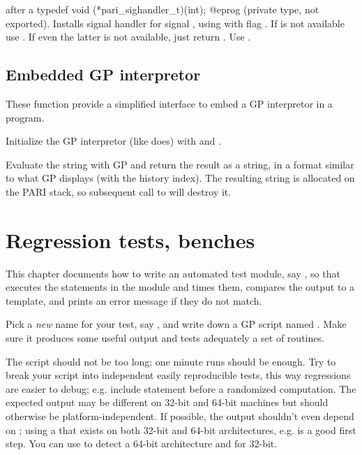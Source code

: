  after a
\bprog
  typedef void (*pari_sighandler_t)(int);
@eprog\noindent
(private type, not exported). Installs signal handler  for
signal , using  with flag . If
 is not available use . If even the latter is not
available, just return . Use .

\section{Embedded GP interpretor}
These function provide a simplified interface to embed a GP
interpretor in a program.

Initialize the GP interpretor (like  does) with
  and .

Evaluate the string  with GP and return the result as a string,
in a format similar to what GP displays (with the history index).
The resulting string is allocated on the PARI stack, so subsequent call
to  will destroy it.

\chapter{Regression tests, benches}

This chapter documents how to write an automated test module, say ,
so that  executes the statements in the  module
and times them, compares the output to a template, and prints an error
message if they do not match.

\item Pick a \emph{new} name for your test, say , and write down a
GP script named . Make sure it produces some useful output and tests
adequately a set of routines.

\item The script should not be too long: one minute runs should be enough.
Try to break your script into independent easily reproducible tests, this way
regressions are easier to debug; e.g. include  statement before
a randomized computation. The expected output may be different on 32-bit and
64-bit machines but should otherwise be platform-independent. If possible, the
output shouldn't even depend on ; using a 
that exists on both 32-bit and 64-bit architectures, e.g.  is a
good first step. You can use  to detect a 64-bit
architecture and  for 32-bit.

